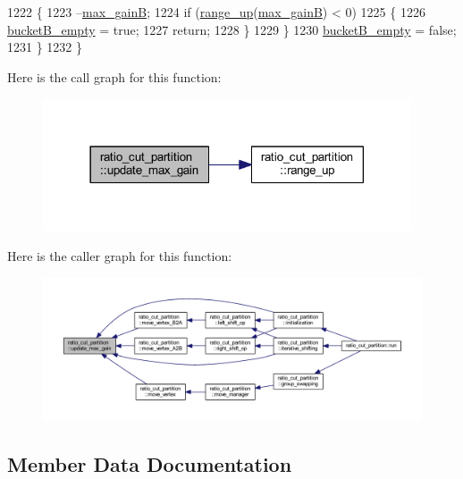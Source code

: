 \begin{DoxyCode}
1222     \{
1223         --\mbox{\hyperlink{classratio__cut__partition_af184ffdb46e49b1fc95faa1e6a91cc8e}{max\_gainB}};
1224         \textcolor{keywordflow}{if} (\mbox{\hyperlink{classratio__cut__partition_a5cda26b908793b59881798d88b07344c}{range\_up}}(\mbox{\hyperlink{classratio__cut__partition_af184ffdb46e49b1fc95faa1e6a91cc8e}{max\_gainB}}) < 0)
1225         \{
1226         \mbox{\hyperlink{classratio__cut__partition_af4bbd571d19340f92519240b96b52702}{bucketB\_empty}} = \textcolor{keyword}{true};
1227         \textcolor{keywordflow}{return};
1228         \}
1229     \}
1230     \mbox{\hyperlink{classratio__cut__partition_af4bbd571d19340f92519240b96b52702}{bucketB\_empty}} = \textcolor{keyword}{false};
1231     \}
1232 \}
\end{DoxyCode}
Here is the call graph for this function\+:\nopagebreak
\begin{figure}[H]
\begin{center}
\leavevmode
\includegraphics[width=309pt]{classratio__cut__partition_afbe33417996a8e040d4d802a1116e134_cgraph}
\end{center}
\end{figure}
Here is the caller graph for this function\+:\nopagebreak
\begin{figure}[H]
\begin{center}
\leavevmode
\includegraphics[width=350pt]{classratio__cut__partition_afbe33417996a8e040d4d802a1116e134_icgraph}
\end{center}
\end{figure}


\subsection{Member Data Documentation}
\mbox{\label{classratio__cut__partition_a9c0da5ad845b01bddbc1f238fa35cdd0}} 
